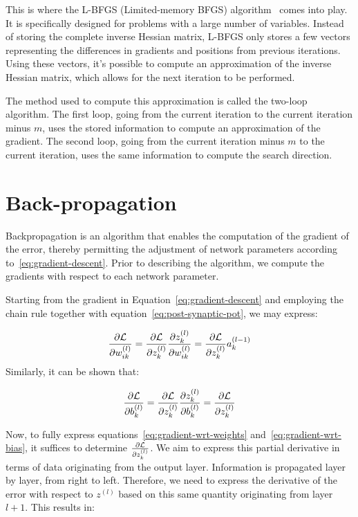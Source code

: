 This is where the L-BFGS (Limited-memory BFGS) algorithm~\cite{nocedal1980updating} comes into play. It is specifically designed for problems with a large number of variables. Instead of storing the complete inverse Hessian matrix, L-BFGS only stores a few vectors representing the differences in gradients and positions from previous iterations. Using these vectors, it's possible to compute an approximation of the inverse Hessian matrix, which allows for the next iteration to be performed.

The method used to compute this approximation is called the two-loop algorithm. The first loop, going from the current iteration to the current iteration minus $m$, uses the stored information to compute an approximation of the gradient. The second loop, going from the current iteration minus $m$ to the current iteration, uses the same information to compute the search direction.

\section{Back-propagation}\label{sec:backprop}

Backpropagation is an algorithm that enables the computation of the gradient of the error, thereby permitting the adjustment of network parameters according to~\eqref{eq:gradient-descent}. Prior to describing the algorithm, we compute the gradients with respect to each network parameter.

Starting from the gradient in Equation~\eqref{eq:gradient-descent} and employing the chain rule together with equation~\eqref{eq:post-synaptic-pot}, we may express:

\begin{equation}
\label{eq:gradient-wrt-weights}
\frac{\partial \mathcal{L}}{\partial w_{ik}^{(l)}} = \frac{\partial \mathcal{L}}{\partial z_{k}^{(l)}}\frac{\partial z_{k}^{(l)}}{\partial w_{ik}^{(l)}} = \frac{\partial \mathcal{L}}{\partial z_{k}^{(l)}} a_{k}^{(l-1)}
\end{equation}
Similarly, it can be shown that:

\begin{equation}
\label{eq:gradient-wrt-bias}
\frac{\partial \mathcal{L}}{\partial b_{k}^{(l)}} = \frac{\partial \mathcal{L}}{\partial z_{k}^{(l)}}\frac{\partial z_{k}^{(l)}}{\partial b_{k}^{(l)}} = \frac{\partial \mathcal{L}}{\partial z_{k}^{(l)}}
\end{equation}

Now, to fully express equations~\eqref{eq:gradient-wrt-weights} and~\eqref{eq:gradient-wrt-bias}, it suffices to determine $\frac{\partial \mathcal{L}}{\partial z_{k}^{(l)}}$. We aim to express this partial derivative in terms of data originating from the output layer. Information is propagated layer by layer, from right to left. Therefore, we need to express the derivative of the error with respect to $z^{(l)}$ based on this same quantity originating from layer $l+1$. This results in:

